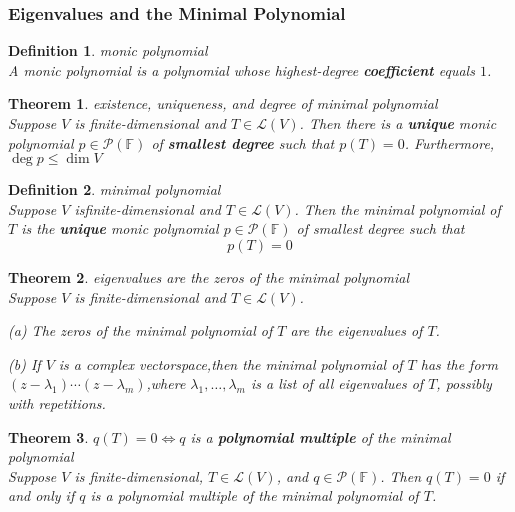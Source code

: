 \documentclass{article}
\newtheorem{theorem}{Theorem}[subsection]
\newtheorem{definition}{Definition}[subsection]
\newcommand{\FF}{\mathbb{F}}
\begin{document}
\begin{CJK}{UTF8}{gkai}
\subsubsection{Eigenvalues and the Minimal Polynomial}

\begin{definition}
    monic polynomial\\

    A monic polynomial is a polynomial whose highest-degree \textbf{coefficient} equals $1$.
\end{definition}

\begin{theorem}
    existence, uniqueness, and degree of minimal polynomial\\

    Suppose $V$ is finite-dimensional and $T \in \mathcal{L}(V)$. Then there is a \textbf{unique} monic polynomial $p \in \mathcal{P}(\FF)$ of \textbf{smallest degree} such that $p(T) = 0$. Furthermore, $\deg p \leq \dim V$
\end{theorem}

\begin{definition}
    minimal polynomial\\

    Suppose $V$ isfinite-dimensional and $T \in \mathcal{L}(V)$. Then the minimal polynomial of $T$ is the \textbf{unique} monic polynomial $p \in \mathcal{P}(\FF)$ of smallest degree such that
    \[ p(T) = 0\]
\end{definition}

\begin{theorem}
    eigenvalues are the zeros of the minimal polynomial\\

    Suppose $V$ is finite-dimensional and $T\in\mathcal{L}(V)$.

 (a) The zeros of the minimal polynomial of $T$ are the eigenvalues of $T$.
 
 (b) If $V$ is a complex vectorspace,then the minimal polynomial of $T$ has the form $(z-\lambda_1)\cdots(z-\lambda_m )$,where $\lambda_1,\ldots,\lambda_m$ is a list of all eigenvalues of $T$, possibly with repetitions.
\end{theorem}

\begin{theorem}
    $q (T) = 0 \Leftrightarrow q$ is a \textbf{polynomial multiple} of the minimal polynomial\\

    Suppose $V$ is finite-dimensional, $T \in \mathcal{L}(V)$, and $q \in \mathcal{P}(\FF)$. Then $q (T) = 0$ if and only if $q$ is a polynomial multiple of the minimal polynomial of $T$.
\end{theorem}


\end{CJK}
\end{document}
